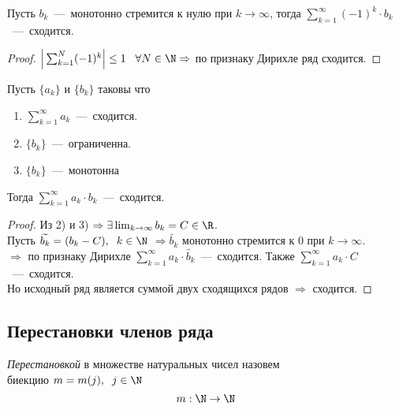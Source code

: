 \begin{corollary}
    \text{}
    
    Пусть $b_k$~---~монотонно стремится к нулю при $k \rightarrow \infty$, тогда $\sum_{k=1}^{\infty}(-1)^k \cdot b_k$~---~сходится.
\end{corollary}
\begin{proof}
    $\Big|\sum_{k = 1}^{N}(-1)^k\Big| \leq 1 \hspace{0.3cm} \forall N \in \N \Rightarrow$ по признаку Дирихле ряд сходится.
\end{proof}

\begin{corollary}
    \text{}

    Пусть $\{a_k\}$ и $\{b_k\}$ таковы что 
    \begin{enumerate}
        \item $\sum_{k=1}^{\infty}a_k$~---~сходится.
        \item $\{b_k\}$~---~ограниченна.
        \item $\{b_k\}$~---~монотонна
    \end{enumerate}
    Тогда $\sum_{k = 1}^{\infty}a_k\cdot b_k$~---~сходится.
\end{corollary}
\begin{proof}
    \text{} 
    
    Из 2) и 3) $\Rightarrow \exists \lim_{k\rightarrow\infty}b_k = C \in \R$. \\ 
    Пусть $\widetilde{b_k} = (b_k - C), \hspace{0.2cm} k \in \N$ $\Rightarrow \widetilde{b_k}$ монотонно стремится к 0 при $k\rightarrow\infty$.\\
    $\Rightarrow$ по признаку Дирихле $\sum_{k = 1}^{\infty}a_k\cdot \widetilde{b_k}$~---~сходится.
    Также $\sum_{k = 1}^{\infty}a_k\cdot C$~---~сходится. \\
    Но исходный ряд является суммой двух сходящихся рядов $\Rightarrow$ сходится.
\end{proof}

\subsection{Перестановки членов ряда}
\begin{definition}
    \textit{Перестановкой} в множестве натуральных чисел назовем \\ биекцию $m = m(j), \hspace{0.2cm} j \in \N$
    \[m: \N \rightarrow \N\]
\end{definition}

